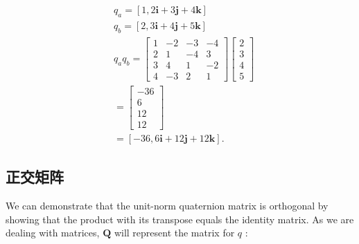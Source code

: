 $$
    \begin{aligned}
         & q_{a}=[1,2 \mathbf{i}+3 \mathbf{j}+4 \mathbf{k}]                                           \\
         & q_{b}=[2,3 \mathbf{i}+4 \mathbf{j}+5 \mathbf{k}]                                           \\
         & q_{a} q_{b}=\left[\begin{array}{rrrr}
                1 & -2 & -3 & -4 \\
                2 & 1  & -4 & 3  \\
                3 & 4  & 1  & -2 \\
                4 & -3 & 2  & 1
            \end{array}\right]\left[\begin{array}{l}
                2 \\
                3 \\
                4 \\
                5
            \end{array}\right] \\
         & =\left[\begin{array}{r}
                -36 \\
                6   \\
                12  \\
                12
            \end{array}\right]                                                   \\
         & =[-36,6 \mathbf{i}+12 \mathbf{j}+12 \mathbf{k}] \text {. }
    \end{aligned}
$$

\subsection{正交矩阵}
We can demonstrate that the unit-norm quaternion matrix is orthogonal by showing that the product with its transpose equals the identity matrix. As we are dealing with matrices, $\mathbf{Q}$ will represent the matrix for $q$ :

